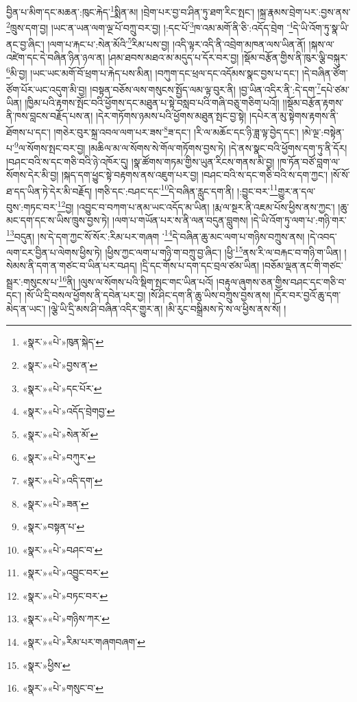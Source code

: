 བྱིན་པ་མིག་དང་མཆན་:ཁུང་རྐེད་\footnote{«སྣར་»«པེ་»ཁུན་སྐེད་}སྨིན་མ། །བྲེག་པར་བྱ་བ་ཤིན་ཏུ་ཐག་རིང་སྤང་། །སྐྲ་རྣམས་བྲེག་པར་:བྱས་ནས་\footnote{«སྣར་»«པེ་»བྱས་ན་}ཁྲུས་དག་བྱ། །ཡང་ན་ཡན་ལག་ལྔ་པོ་བཀྲུ་བར་བྱ། །:དང་པོ་\footnote{«སྣར་»«པེ་»དང་པོར་}ཁ་འམ་མགོ་ནི་ཅི་:འདོད་བྲེག ་\footnote{«སྣར་»«པེ་»འདོད་བྲེགབྱ་}དེ་ཡི་འོག་ཏུ་སྣ་ཡི་ནང་བྱ་ཞིང་། །ལག་པ་རྐང་པ་:སེན་མོའི་\footnote{«སྣར་»«པེ་»སེན་མོ་}རིམ་པས་བྱ། །འདི་ལྟར་འདི་ནི་འབྲེག་མཁན་ལས་ཡིན་ནོ། །སྐས་ལ་འཛེག་དང་དེ་བཞིན་ཉིན་ཉལ་ན། །ཤམ་ཐབས་མཐའ་མ་མདུད་པ་དོར་བར་བྱ། །སྡོམ་བརྩོན་གྱིས་ནི་ཁུར་ལྕི་བསྐུར་\footnote{«སྣར་»«པེ་»བཀུར་}མི་བྱ། །ཡང་ཡང་མགོ་བོ་ཕྲག་པ་རྐེད་པས་མིན། །བཀུག་དང་ཕྲལ་དང་འདོམས་སྣང་བྱས་པ་དང་། །དེ་བཞིན་ཙོག་ཙོག་པོར་ཡང་འདུག་མི་བྱ། །བསྟན་བཅོས་ལས་གསུངས་སྤྱོད་ལམ་ལྟ་བུར་ནི། །བྱ་ཡིན་འདིར་ནི་:དེ་དག་\footnote{«སྣར་»«པེ་»འདི་དག་}དཔེ་ཙམ་ཡིན། །ཁྱིམ་པའི་རྟགས་སྤོང་བའི་ཕྱོགས་དང་མཐུན་པ་སྟེ་བསླབ་པའི་གཞི་བཅུ་གཅིག་པའོ།། །།སྡོམ་བརྩོན་རྟགས་ནི་ཁས་བླངས་བརྗོད་པས་ན། །དེར་གཏོགས་ཉམས་པའི་ཕྱོགས་མཐུན་སྤང་བྱ་སྟེ། །དཔེར་ན་མུ་སྟེགས་རྟགས་ནི་ཐོགས་པ་དང་། །གཅེར་བུར་སྐྲ་འབལ་ལག་པར་ཟས་\footnote{«སྣར་»«པེ་»ཟན་}ཟ་དང་། །རི་ལ་མཆོང་དང་ཉི་ཟླ་ལྟ་བྱེད་དང་། །མེ་ལྔ་:བསྟེན་པ་\footnote{«སྣར་»བསྟན་པ་}ལ་སོགས་སྤང་བར་བྱ། །མཆིལ་མ་ལ་སོགས་སེ་གོལ་གཏོགས་བྱས་ཏེ། །དེ་ནས་སྣང་བའི་ཕྱོགས་དག་ཏུ་ནི་དོར། །བཤང་བའི་ས་དང་གཅི་བའི་ཉེ་འཁོར་དུ། །སྣ་ཚོགས་གཏམ་གྱིས་ཡུན་རིངས་གནས་མི་བྱ། །ཁ་ཏོན་བཙོ་བླག་ལ་སོགས་དེར་མི་བྱ། །སྐད་དག་ཕྱུང་སྟེ་བརྟགས་ནས་འཇུག་པར་བྱ། །བཤང་བའི་ས་དང་གཅི་བའི་ས་དག་ཀྱང་། །སོ་སོ་ཐ་དད་ཡིན་ཏེ་དེར་མི་བརྗོད། །གཅི་དང་:བཤང་དང་\footnote{«སྣར་»«པེ་»བཤང་བ་}དེ་བཞིན་རླུང་དག་ནི། །:བྱུང་བར་\footnote{«སྣར་»«པེ་»འབྱུང་བར་}གྱུར་ན་དལ་བུས་:གཏང་བར་\footnote{«སྣར་»«པེ་»བཏང་བར་}བྱ། །འབྱུང་བ་བཀག་པ་ནམ་ཡང་འདོད་མ་ཡིན། །རྨ་ལ་སྔར་ནི་འཇམ་པོས་ཕྱིས་ནས་ཀྱང་། །ཆུ་མང་དག་དང་ས་ཡིས་ཁྲུས་བྱས་ཏེ། །ལག་པ་གཡོན་པར་ས་ནི་ལན་བདུན་བླུགས། །དེ་ཡི་འོག་ཏུ་ལག་པ་:གཉི་གར་\footnote{«སྣར་»«པེ་»གཉིས་ཀར་}བདུན། །ས་དེ་དག་ཀྱང་སོ་སོར་:རིམ་པར་གཞག ་\footnote{«སྣར་»«པེ་»རིམ་པར་གཞགབཞག་}དེ་བཞིན་ཆུ་མང་ལག་པ་གཉིས་བཀྲུས་ནས། །དེ་འབད་ལག་ངར་བྱིན་པ་ལེགས་ཕྱིས་ཏེ། །ཕྱིས་ཀྱང་ལག་པ་གཉི་ག་བཀྲུ་བྱ་ཞིང་། །ཕྱི་\footnote{«སྣར་»ཕྱིས་}ནས་རི་ལ་བརྐང་བ་གཉི་ག་ཡིན། །སེམས་ནི་དག་ན་གཙང་བ་ཡིན་པར་བཤད། །དྲི་དང་གོས་པ་དག་དང་བྲལ་ཙམ་ཡིན། །བཅོམ་ལྡན་ནང་གི་གཙང་སྦྲར་:གསུངས་པ་\footnote{«སྣར་»«པེ་»གསུང་བ་}ནི། །ལུས་ལ་སོགས་པའི་སྡིག་སྤང་གང་ཡིན་པའོ། །བརྟུལ་ཞུགས་ཅན་གྱིས་བཤང་དང་གཅི་བ་དང་། །སོ་ཡི་དྲི་བསལ་ཕྱོགས་ནི་དབེན་པར་བྱ། །སོ་ཤིང་དག་ནི་ཆུ་ཡིས་བཀྲུས་བྱས་ནས། །དོར་བར་བྱའོ་ཆུ་དག་མེད་ན་ཡང་། །ལྕེ་ཡི་དྲི་མས་ཤི་བཞིན་འདིར་གྱུར་ན། །མི་རུང་བསྒྲིམས་ཏེ་ས་ལ་ཕྱིས་ནས་སོ། །
